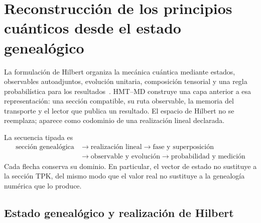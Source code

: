 
\section{Reconstrucción de los principios cuánticos desde el estado genealógico}
\label{sec:postulados-cuanticos-genealogicos-rev2}

La formulación de Hilbert organiza la mecánica cuántica mediante estados,
observables autoadjuntos, evolución unitaria, composición tensorial y una
regla probabilística para los resultados~\cite{vonNeumann1932}. HMT--MD
construye una capa anterior a esa representación: una sección compatible,
su ruta observable, la memoria del transporte y el lector que publica un
resultado. El espacio de Hilbert no se reemplaza; aparece como codominio de
una realización lineal declarada.

La secuencia tipada es
\[
 \boxed{\begin{aligned}
 \text{sección genealógica}
 &\longrightarrow \text{realización lineal}
 \longrightarrow \text{fase y superposición}\\
 &\longrightarrow \text{observable y evolución}
 \longrightarrow \text{probabilidad y medición}
 \end{aligned}}
\]
Cada flecha conserva su dominio. En particular, el vector de estado no
sustituye a la sección TPK, del mismo modo que el valor real no sustituye a
la genealogía numérica que lo produce.

\subsection{Estado genealógico y realización de Hilbert}

